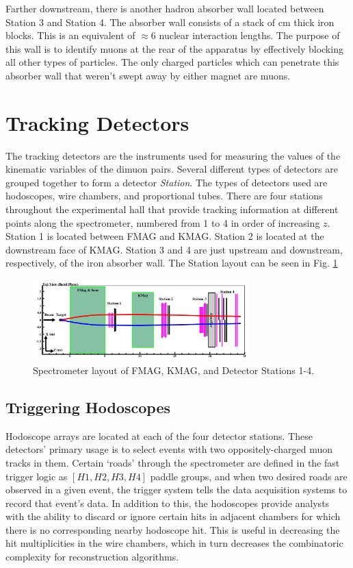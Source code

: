 Farther downstream, there is another hadron absorber wall located between Station 3 and Station 4. The absorber wall consists of a stack of \unit[98]{cm} thick iron blocks. This is an equivalent of $\approx 6$ nuclear interaction lengths. The purpose of this wall is to identify muons at the rear of the apparatus by effectively blocking all other types of particles. The only charged particles which can penetrate this absorber wall that weren't swept away by either magnet are muons.

\section{Tracking Detectors}

The tracking detectors are the instruments used for measuring the values of the kinematic variables of the dimuon pairs. Several different types of detectors are grouped together to form a detector \emph{Station}. The types of detectors used are hodoscopes, wire chambers, and proportional tubes. There are four stations throughout the experimental hall that provide tracking information at different points along the spectrometer, numbered from 1 to 4 in order of increasing $z$. Station 1 is located between FMAG and KMAG. Station 2 is located at the downstream face of KMAG. Station 3 and 4 are just upstream and downstream, respectively, of the iron absorber wall. The Station layout can be seen in Fig. \ref{fig:stations}

\begin{figure}
	\centering
	\includegraphics[width=0.75\textwidth]{figures/apparatus/stations.png}
	\caption{Spectrometer layout of FMAG, KMAG, and Detector Stations 1-4.}
	\label{fig:stations}
\end{figure}

\subsection{Triggering Hodoscopes}

Hodoscope arrays are located at each of the four detector stations. These detectors' primary usage is to select events with two oppositely-charged muon tracks in them. Certain `roads' through the spectrometer are defined in the fast trigger logic as $[H1, H2, H3, H4]$ paddle groups, and when two desired roads are observed in a given event, the trigger system tells the data acquisition systems to record that event's data. In addition to this, the hodoscopes provide analysts with the ability to discard or ignore certain hits in adjacent chambers for which there is no corresponding nearby hodoscope hit. This is useful in decreasing the hit multiplicities in the wire chambers, which in turn decreases the combinatoric complexity for reconstruction algorithms.


